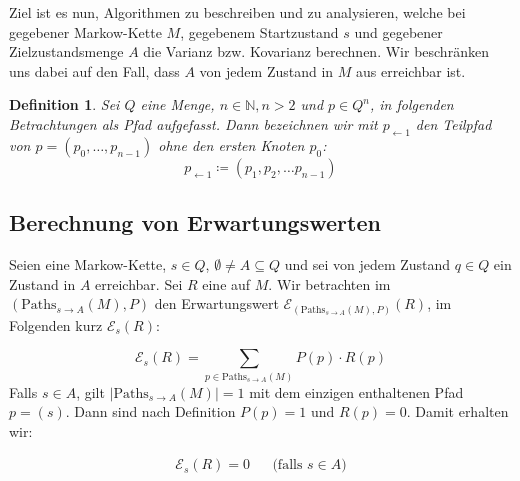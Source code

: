 \documentclass[a4paper]{article}
\newcommand{\mc}{Markow-Kette}
\newtheorem{definition}[satz]{Definition} %
\theoremstyle{nonumberplain}
\begin{document}
	Ziel ist es nun, Algorithmen zu beschreiben und zu analysieren, welche bei gegebener \mc{} $M$, gegebenem Startzustand $s$ und gegebener Zielzustandsmenge $A$ die Varianz bzw. Kovarianz berechnen. Wir beschränken uns dabei auf den Fall, dass $A$ von jedem Zustand in $M$ aus erreichbar ist.
	
	\begin{definition}
		Sei $Q$ eine Menge, $n\in \mathbb{N}, n>2$ und $p \in Q^n$, in folgenden Betrachtungen als Pfad aufgefasst. Dann bezeichnen wir mit $p_{\leftarrow 1}$ den Teilpfad von $p = (p_0, \dots, p_{n-1})$ ohne den ersten Knoten $p_0$:
		\begin{equation}
		p_{\leftarrow 1} \coloneqq (p_1,p_2, \dots p_{n-1})
		\end{equation}
	\end{definition}
	
	\subsection{Berechnung von Erwartungswerten}
	
	Seien \mcex{} eine \mc{}, $s \in Q$, $\emptyset \neq A \subseteq Q$ und sei von jedem Zustand $q\in Q$ ein Zustand in $A$ erreichbar. Sei $R$ eine \reward{} auf $M$. Wir betrachten im \probspacen{} $(\mathrm{Paths}_{s \rightarrow A}(M), P)$ den Erwartungswert $\mathcal{E}_{(\mathrm{Paths}_{s \rightarrow A}(M), P)}(R)$, im Folgenden kurz $\mathcal{E}_{s}(R)$:
	
	\begin{equation}
	\mathcal{E}_{s}(R) = \sum_{p \in \mathrm{Paths}_{s \rightarrow A}(M)}{P(p) \cdot R(p)} 
	\end{equation}
	Falls $s \in A$, gilt $|\mathrm{Paths}_{s \rightarrow A}(M)| = 1$ mit dem einzigen enthaltenen Pfad $p = (s)$. Dann sind nach Definition $P(p) = 1$ und $R(p) = 0$. Damit erhalten wir:
	
	\begin{align}
	\mathcal{E}_{s}(R) = 0 && \text{(falls $s \in A$)}\label{expect_trivial}
	\end{align}
	
\end{document}
